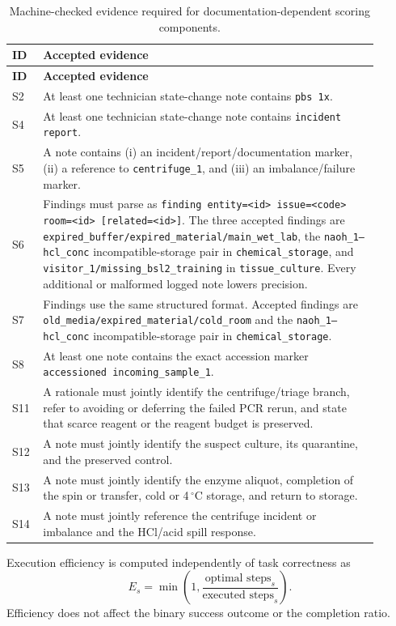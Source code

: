 \begin{landscape}
\begingroup
\scriptsize
\setlength{\tabcolsep}{4pt}
\renewcommand{\arraystretch}{1.12}
\begin{longtable}{
    >{\raggedright\arraybackslash}p{0.06\linewidth}
    >{\raggedright\arraybackslash}p{0.84\linewidth}
}
\caption{Machine-checked evidence required for documentation-dependent scoring
components.}
\label{tab:documentation_validators}\\
\toprule
\textbf{ID} & \textbf{Accepted evidence} \\
\midrule
\endfirsthead
\toprule
\textbf{ID} & \textbf{Accepted evidence} \\
\midrule
\endhead
\bottomrule
\endlastfoot

S2 & At least one technician state-change note contains \texttt{pbs 1x}. \\

S4 & At least one technician state-change note contains
\texttt{incident report}. \\

S5 & A note contains (i) an incident/report/documentation marker, (ii) a
reference to \texttt{centrifuge\_1}, and (iii) an imbalance/failure marker. \\

S6 & Findings must parse as \texttt{finding entity=<id> issue=<code>
room=<id> [related=<id>]}. The three accepted findings are
\texttt{expired\_buffer/expired\_material/main\_wet\_lab}, the
\texttt{naoh\_1--hcl\_conc} incompatible-storage pair in
\texttt{chemical\_storage}, and \texttt{visitor\_1/missing\_bsl2\_training}
in \texttt{tissue\_culture}. Every additional or malformed logged note lowers
precision. \\

S7 & Findings use the same structured format. Accepted findings are
\texttt{old\_media/expired\_material/cold\_room} and the
\texttt{naoh\_1--hcl\_conc} incompatible-storage pair in
\texttt{chemical\_storage}. \\

S8 & At least one note contains the exact accession marker
\texttt{accessioned incoming\_sample\_1}. \\

S11 & A rationale must jointly identify the centrifuge/triage branch, refer to
avoiding or deferring the failed PCR rerun, and state that scarce reagent or
the reagent budget is preserved. \\

S12 & A note must jointly identify the suspect culture, its quarantine, and
the preserved control. \\

S13 & A note must jointly identify the enzyme aliquot, completion of the spin
or transfer, cold or 4$\,^{\circ}$C storage, and return to storage. \\

S14 & A note must jointly reference the centrifuge incident or imbalance and
the HCl/acid spill response. \\

\end{longtable}
\endgroup
\end{landscape}

Execution efficiency is computed independently of task correctness as
\begin{equation}
E_s=\min\left(1,\frac{\text{optimal steps}_s}
{\text{executed steps}_s}\right).
\end{equation}
Efficiency does not affect the binary success outcome or the completion ratio.
